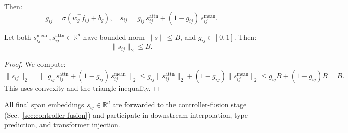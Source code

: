 Then:
\[
g_{ij} = \sigma(w_g^\top f_{ij} + b_g),
\quad
s_{ij} = g_{ij}\,s_{ij}^{\mathrm{attn}} + (1 - g_{ij})\,s_{ij}^{\mathrm{mean}}.
\]

\begin{proposition}
	Let both \(s_{ij}^{\mathrm{mean}},s_{ij}^{\mathrm{attn}}\in\mathbb{R}^d\) have bounded norm \(\|s\|\le B\), and \(g_{ij}\in[0,1]\). Then:
	\[
	\|s_{ij}\|_2 \le B.
	\]
\end{proposition}

\begin{proof}
	We compute:
	\[
	\|s_{ij}\|_2 = \big\|\,g_{ij}\,s_{ij}^{\mathrm{attn}} + (1-g_{ij})\,s_{ij}^{\mathrm{mean}}\,\big\|_2
	\le g_{ij}\|s_{ij}^{\mathrm{attn}}\|_2 + (1-g_{ij})\|s_{ij}^{\mathrm{mean}}\|_2
	\le g_{ij}B + (1-g_{ij})B = B.
	\]
	This uses convexity and the triangle inequality.
\end{proof}

All final span embeddings \(s_{ij}\in\mathbb{R}^d\) are forwarded to the controller-fusion stage (Sec.~\ref{sec:controller-fusion}) and participate in downstream interpolation, type prediction, and transformer injection.